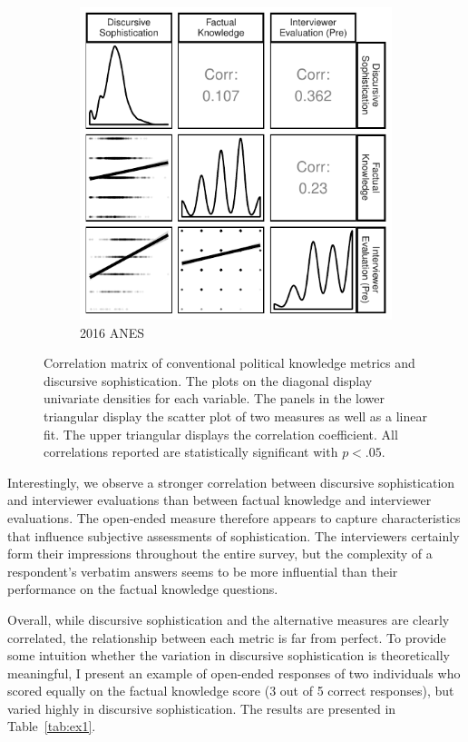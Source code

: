 \documentclass[12pt]{article}
\begin{document}
\begin{figure}[t!]
\begin{subfigure}[t]{0.5\textwidth}
        \includegraphics{../fig/corplot_pres2016.pdf}
        \caption{2016 ANES}
    \end{subfigure}
    \caption{Correlation matrix of conventional political knowledge metrics and discursive sophistication. The plots on the diagonal display univariate densities for each variable. The panels in the lower triangular display the scatter plot of two measures as well as a linear fit. The upper triangular displays the correlation coefficient. All correlations reported are statistically significant with $p<.05$.}\label{fig:corplot}
\end{figure}

Interestingly, we observe a stronger correlation between discursive sophistication and interviewer evaluations than between factual knowledge and interviewer evaluations. The open-ended measure therefore appears to capture characteristics that influence subjective assessments of sophistication. The interviewers certainly form their impressions throughout the entire survey, but the complexity of a respondent's verbatim answers seems to be more influential than their performance on the factual knowledge questions.

Overall, while discursive sophistication and the alternative measures are clearly correlated, the relationship between each metric is far from perfect. To provide some intuition whether the variation in discursive sophistication is theoretically meaningful, I present an example of open-ended responses of two individuals who scored equally on the factual knowledge score (3 out of 5 correct responses), but varied highly in discursive sophistication. The results are presented in Table~\ref{tab:ex1}.
\end{document}
